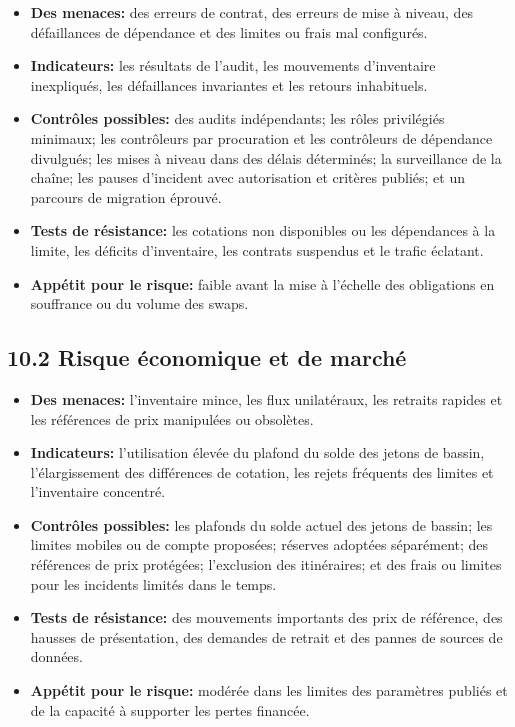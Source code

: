 \documentclass[11pt]{article}
\begin{document}
\begin{itemize}[leftmargin=*]
\item \textbf{Des menaces:} des erreurs de contrat, des erreurs de mise à niveau, des défaillances de dépendance et des limites ou frais mal configurés.
\item \textbf{Indicateurs:} les résultats de l'audit, les mouvements d'inventaire inexpliqués, les défaillances invariantes et les retours inhabituels.
\item \textbf{Contrôles possibles:} des audits indépendants; les rôles privilégiés minimaux; les contrôleurs par procuration et les contrôleurs de dépendance divulgués; les mises à niveau dans des délais déterminés; la surveillance de la chaîne; les pauses d'incident avec autorisation et critères publiés; et un parcours de migration éprouvé.
\item \textbf{Tests de résistance:} les cotations non disponibles ou les dépendances à la limite, les déficits d'inventaire, les contrats suspendus et le trafic éclatant.
\item \textbf{Appétit pour le risque:} faible avant la mise à l'échelle des obligations en souffrance ou du volume des swaps.
\end{itemize}
\subsection*{10.2 Risque économique et de marché}

\begin{itemize}[leftmargin=*]
\item \textbf{Des menaces:} l'inventaire mince, les flux unilatéraux, les retraits rapides et les références de prix manipulées ou obsolètes.
\item \textbf{Indicateurs:} l'utilisation élevée du plafond du solde des jetons de bassin, l'élargissement des différences de cotation, les rejets fréquents des limites et l'inventaire concentré.
\item \textbf{Contrôles possibles:} les plafonds du solde actuel des jetons de bassin; les limites mobiles ou de compte proposées; réserves adoptées séparément; des références de prix protégées; l'exclusion des itinéraires; et des frais ou limites pour les incidents limités dans le temps.
\item \textbf{Tests de résistance:} des mouvements importants des prix de référence, des hausses de présentation, des demandes de retrait et des pannes de sources de données.
\item \textbf{Appétit pour le risque:} modérée dans les limites des paramètres publiés et de la capacité à supporter les pertes financée.
\end{itemize}
\end{document}

